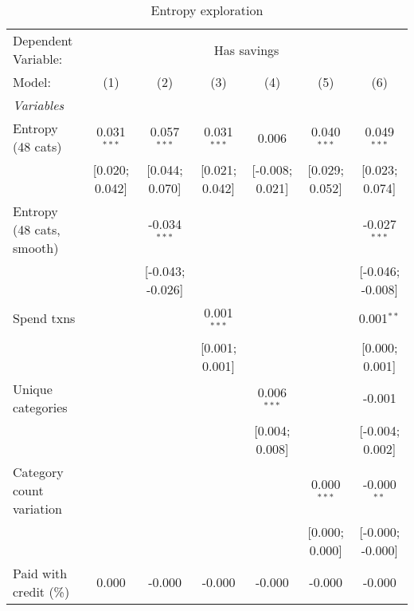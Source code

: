 
\begin{table}[htbp]
   \centering
   \tiny
   \begin{threeparttable}[b]
      \caption{\label{tab:reg_has_sa_inflows_explore} Entropy exploration}
      \begin{tabular}{lcccccc}
         \tabularnewline \midrule \midrule
         Dependent Variable: & \multicolumn{6}{c}{Has savings}\\
         Model:                    & (1)             & (2)              & (3)             & (4)             & (5)             & (6)\\  
         \midrule
         \emph{Variables}\\
         Entropy (48 cats)         & 0.031$^{***}$   & 0.057$^{***}$    & 0.031$^{***}$   & 0.006           & 0.040$^{***}$   & 0.049$^{***}$\\   
                                   & [0.020; 0.042]  & [0.044; 0.070]   & [0.021; 0.042]  & [-0.008; 0.021] & [0.029; 0.052]  & [0.023; 0.074]\\   
         Entropy (48 cats, smooth) &                 & -0.034$^{***}$   &                 &                 &                 & -0.027$^{***}$\\   
                                   &                 & [-0.043; -0.026] &                 &                 &                 & [-0.046; -0.008]\\   
         Spend txns                &                 &                  & 0.001$^{***}$   &                 &                 & 0.001$^{**}$\\   
                                   &                 &                  & [0.001; 0.001]  &                 &                 & [0.000; 0.001]\\   
         Unique categories         &                 &                  &                 & 0.006$^{***}$   &                 & -0.001\\   
                                   &                 &                  &                 & [0.004; 0.008]  &                 & [-0.004; 0.002]\\   
         Category count variation  &                 &                  &                 &                 & 0.000$^{***}$   & -0.000$^{**}$\\   
                                   &                 &                  &                 &                 & [0.000; 0.000]  & [-0.000; -0.000]\\   
         Paid with credit (\%)     & 0.000           & -0.000           & -0.000          & -0.000          & -0.000          & -0.000\\   

\end{tabular}
\end{threeparttable}
\end{table}

